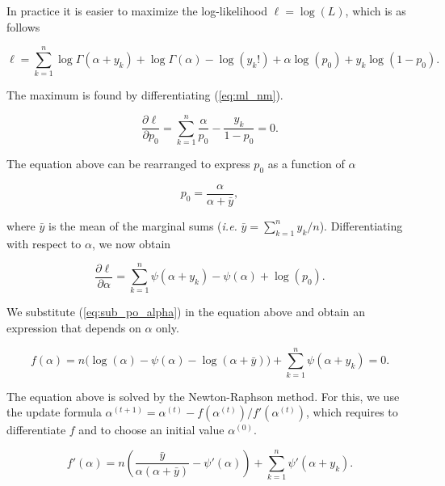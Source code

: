 \documentclass[12pt]{article}
\begin{document}
\begin{appendices}
    In practice it is easier to maximize the log-likelihood
    $\ell = \log(L)$, which is as follows

    \begin{equation}
\label{eq:ml_nm}
      \ell = \sum_{k=1}^n \log\Gamma(\alpha+y_k) +
      \log\Gamma(\alpha) -\log(y_k!) +
      \alpha \log(p_0) + y_k\log(1-p_0).
    \end{equation}

    The maximum is found by differentiating (\ref{eq:ml_nm}).

    \begin{equation*}
      \frac{\partial\ell}{\partial p_0} = \sum_{k=1}^n
      \frac{\alpha}{p_0}-\frac{y_k}{1-p_0} = 0.
    \end{equation*}

    The equation above can be rearranged to express $p_0$ as
    a function of $\alpha$

    \begin{equation}
\label{eq:sub_po_alpha}
      p_0 = \frac{\alpha}{\alpha + \bar{y}},
    \end{equation}

    \noindent
    where $\bar{y}$ is the mean of the marginal sums (\textit{i.e.}
    $\bar{y} = \sum_{k=1}^ny_k / n$). Differentiating with respect
    to $\alpha$, we now obtain

    \begin{equation*}
      \frac{\partial\ell}{\partial\alpha} = \sum_{k=1}^n
      \psi(\alpha+y_k) - \psi(\alpha) + \log(p_0).
    \end{equation*}

    We substitute (\ref{eq:sub_po_alpha}) in the equation above
    and obtain an expression that depends on $\alpha$ only.

    \begin{equation}
\label{eq:NR_f}
      f(\alpha) = n \Big(\log(\alpha) - \psi(\alpha)
      - \log (\alpha + \bar{y}) \Big)
      + \sum_{k=1}^n \psi(\alpha+y_k) = 0.
    \end{equation}

    The equation above is solved by the Newton-Raphson method. For
    this, we use the update formula
    $\alpha^{(t+1)} = \alpha^{(t)} - f(\alpha^{(t)})/f'(\alpha^{(t)})$,
    which requires to differentiate $f$ and to choose an initial
    value $\alpha^{(0)}$.

    \begin{equation*}
      f'(\alpha) = n \left(\frac{\bar{y}} {\alpha(\alpha+\bar{y})}
      -\psi'(\alpha) \right)
      + \sum_{k=1}^n \psi'(\alpha+y_k).
    \end{equation*}


\end{appendices}
\end{document}
